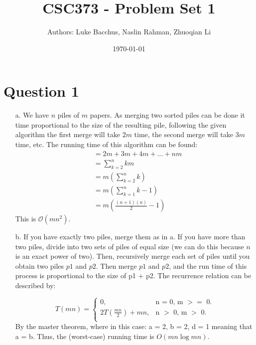 \documentclass[12pt]{article}
\title{\textbf{CSC373 - Problem Set 1}}
\author{Authors: Luke Bacchus, Naslin Rahman, Zhuoqian Li}
\date{\today}
\begin{document}
\maketitle
\section*{Question 1}
\begin{enumerate}
    \item[a.] We have $n$ piles of $m$ papers. As merging two sorted piles can be done it time proportional to the size of the resulting pile, following the given algorithm the first merge will take $2m$ time, the second merge will take $3m$ time, etc. 
    The running time of this algorithm can be found:
    \begin{align*}
        &= 2m + 3m + 4m + ... + nm \\
        &= \sum_{k=2}^n km \\
        &= m(\sum_{k=2}^n k) \\
        &= m(\sum_{k=1}^n k-1) \\
        &= m(\frac{(n+1)(n)}{2} - 1)
    \end{align*}
    This is $\mathcal{O}(mn^2)$.
    \item[b.] If you have exactly two piles, merge them as in a. If you have more than two piles, divide into two sets of piles of equal size (we can do this because $n$ is an exact power of two). 
    Then, recursively merge each set of piles until you obtain two piles $p1$ and $p2$. Then merge $p1$ and $p2$, and the run time of this process is proportional to the size of p1 + p2. The recurrence relation can be described by:
    
    \begin{equation}
        T(mn) = \begin{cases}
          0, & \text{n = 0, m $>=$ 0}.\\
          2T(\frac{mn}{2}) + mn, & \text{n $>$ 0, m $>$ 0}.\\
    \end{cases}
    \end{equation}
By the master theorem, where in this case: a = 2, b = 2, d = 1 meaning that a = b. Thus, the (worst-case) running time is $O(mn \log mn)$.\end{enumerate}
\newpage
\end{document}
